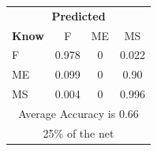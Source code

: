\documentclass[12pt]{article} %
\begin{document}
\begin{minipage}{0.5\textwidth}
\begin{center}
\begin{tabular}{l|c|c|c|}
 \multicolumn{4}{c}{ \textbf{ Predicted}}\\
 \textbf{Know}&F&ME&MS\\ \hline\hline
F   &0.978&0&0.022\\
ME &0.099&0&0.90\\
MS &0.004&0&0.996\\
\multicolumn{4}{c}{Average Accuracy is 0.66}\\
\multicolumn{4}{c}{25\%  of the net}\\
\end{tabular}
\end{center}
\end{minipage}
\end{document}

